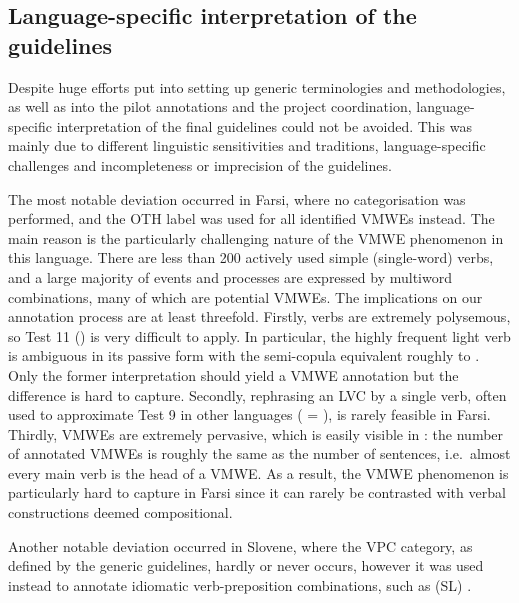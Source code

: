 \documentclass[output=paper,modfonts]{langscibook}
\begin{document}
\subsection{Language-specific interpretation of the guidelines}
\label{sec:lang-spec-guide}
%
Despite huge efforts put into setting up generic terminologies and methodologies, as well as into the pilot annotations and the project coordination, language-specific interpretation of the final guidelines could not be avoided. This was mainly due to different linguistic sensitivities and traditions, language-specific challenges and incompleteness or imprecision of the guidelines.

The most notable deviation occurred in Farsi, where no categorisation was performed, and the OTH label was used for all identified VMWEs instead. The main reason is the particularly challenging nature of the VMWE phenomenon in this language. There are less than 200 actively used simple (single-word) verbs, and a large majority of events and processes are expressed by multiword combinations, many of which are potential VMWEs. 
The implications on our annotation process are at least threefold. Firstly, verbs are extremely polysemous, so Test 11 () is very difficult to apply. In particular, 
the highly frequent light verb 
 is ambiguous in its passive form   with the semi-copula equivalent roughly to . Only the former interpretation should yield a VMWE annotation but the difference is hard to capture.  
Secondly, rephrasing an LVC by a single verb, often used to approximate Test 9 in other languages ( = ), is rarely feasible in Farsi. Thirdly, VMWEs are extremely pervasive, which is easily visible in : the number of annotated VMWEs is roughly the same as the number of sentences, i.e.\ almost every main verb is the head of a VMWE. As a result, the VMWE phenomenon is particularly hard to capture in Farsi since it can rarely be contrasted  with verbal constructions deemed compositional.

Another notable deviation occurred in Slovene, where the VPC category, as defined by the generic guidelines, hardly or never occurs, however it was used instead to annotate idiomatic verb-preposition combinations, such as  (SL) . 
\end{document}
